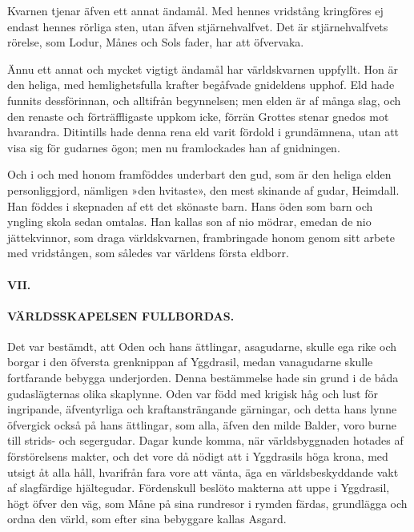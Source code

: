Kvarnen tjenar äfven ett annat ändamål. Med hennes vridstång kringföres
ej endast hennes rörliga sten, utan äfven stjärnehvalfvet. Det är
stjärnehvalfvets rörelse, som Lodur, Månes och Sols fader, har att
öfvervaka.

Ännu ett annat och mycket vigtigt ändamål har världskvarnen uppfyllt.
Hon är den heliga, med hemlighetsfulla krafter begåfvade gnideldens
upphof. Eld hade funnits dessförinnan, och alltifrån begynnelsen; men
elden är af många slag, och den renaste och förträffligaste uppkom icke,
förrän Grottes stenar gnedos mot hvarandra. Ditintills hade denna rena
eld varit fördold i grundämnena, utan att visa sig för gudarnes ögon;
men nu framlockades han af gnidningen.

Och i och med honom framföddes underbart den gud, som är den heliga
elden personliggjord, nämligen »den hvitaste», den mest skinande af
gudar, Heimdall. Han föddes i skepnaden af ett det skönaste barn. Hans
öden som barn och yngling skola sedan omtalas. Han kallas son af nio
mödrar, emedan de nio jättekvinnor, som draga världskvarnen,
frambringade honom genom sitt arbete med vridstången, som således var
världens första eldborr.

\protect\hypertarget{lb1625905.xhtmlux5cux23start13}{}{}\protect\hypertarget{lb1625905.xhtmlux5cux23start13-a}{}{}\protect\hypertarget{lb1625905.xhtmlux5cux23start13-b}{}{}\protect\hypertarget{lb1625905.xhtmlux5cux23start13-c}{}{}\protect\hypertarget{lb1625905.xhtmlux5cux23start13-d}{}{}

\paragraph{VII.}

\paragraph{VÄRLDSSKAPELSEN FULLBORDAS.}

Det var bestämdt, att Oden och hans ättlingar, asagudarne, skulle ega
rike och borgar i den öfversta grenknippan af Yggdrasil, medan
vanagudarne skulle fortfarande bebygga underjorden. Denna bestämmelse
hade sin grund i de båda gudaslägternas olika skaplynne. Oden var född
med krigisk håg och lust för ingripande, äfventyrliga och
kraftansträngande gärningar, och detta hans lynne öfvergick också på
hans ättlingar, som alla, äfven den milde Balder, voro burne till
strids- och segergudar. Dagar kunde komma, när världsbyggnaden hotades
af förstörelsens makter, och det vore då nödigt att i Yggdrasils höga
krona, med utsigt åt alla håll, hvarifrån fara vore att vänta, äga en
världsbeskyddande vakt af slagfärdige hjältegudar. Fördenskull beslöto
makterna att uppe i Yggdrasil, högt öfver den väg, som Måne på sina
rundresor i rymden färdas, grundlägga och ordna den värld, som efter
sina bebyggare kallas Asgard.

